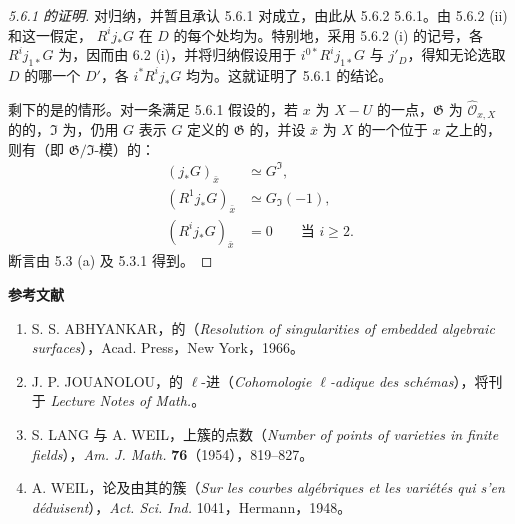 \begin{proof}[ 5.6.1 的证明]
对归纳，并暂且承认 5.6.1 对成立，由此从 5.6.2  5.6.1。由 5.6.2 (ii) 和这一假定， $R^ij_*G$ 在 $D$ 的每个处均为。特别地，采用 5.6.2 (i) 的记号，各 $R^ij_{1*}G$ 为，因而由 6.2 (i)，并将归纳假设用于 $i^{0*}R^ij_{1*}G$ 与 $j'_D$，得知无论选取 $D$ 的哪一个 $D'$，各 $i^*R^ij_*G$ 均为。这就证明了 5.6.1 的结论。

剩下的是的情形。对一条满足 5.6.1 假设的，若 $x$ 为 $X-U$ 的一点，$\mathfrak G$ 为 $\widehat{\mathcal O}_{x,X}$ 的的，$\mathfrak I$ 为，仍用 $G$ 表示 $G$ 定义的 $\mathfrak G$ 的，并设 $\bar x$ 为 $X$ 的一个位于 $x$ 之上的，则有（即 $\mathfrak G/\mathfrak I$-模）的：
\[
\begin{aligned}
(j_*G)_{\bar x}&\simeq G^{\mathfrak I},\\
(R^1j_*G)_{\bar x}&\simeq G_{\mathfrak I}(-1),\\
(R^ij_*G)_{\bar x}&=0\qquad\text{当 }i\geq2.
\end{aligned}
\]
断言由 5.3 (a) 及 5.3.1 得到。
\end{proof}

\textbf{参考文献}

\begin{enumerate}
\item[{[1]}] S. S. ABHYANKAR，的（\textit{Resolution of singularities of embedded algebraic surfaces}），Acad. Press，New York，1966。
\item[{[2]}] J. P. JOUANOLOU，的 $\ell$-进（\textit{Cohomologie $\ell$-adique des schémas}），将刊于 \textit{Lecture Notes of Math.}。
\item[{[3]}] S. LANG 与 A. WEIL，上簇的点数（\textit{Number of points of varieties in finite fields}），\textit{Am. J. Math.} \textbf{76}（1954），819--827。
\item[{[4]}] A. WEIL，论及由其的簇（\textit{Sur les courbes algébriques et les variétés qui s'en déduisent}），\textit{Act. Sci. Ind.} 1041，Hermann，1948。
\end{enumerate}
